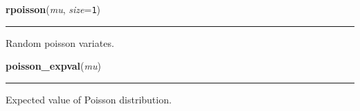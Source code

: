     \vspace{0.5ex}

    \begin{boxedminipage}{\textwidth}

    \raggedright \textbf{rpoisson}(\textit{mu}, \textit{size}=\texttt{1})

    \vspace{-1.5ex}

    \rule{\textwidth}{0.5\fboxrule}

Random poisson variates.
    \vspace{1ex}

    \end{boxedminipage}

    \label{pymc:distributions:poisson_expval}

    \vspace{0.5ex}

    \begin{boxedminipage}{\textwidth}

    \raggedright \textbf{poisson\_expval}(\textit{mu})

    \vspace{-1.5ex}

    \rule{\textwidth}{0.5\fboxrule}

Expected value of Poisson distribution.
    \vspace{1ex}

    \end{boxedminipage}

    \label{pymc:distributions:poisson_like}

    \vspace{0.5ex}

